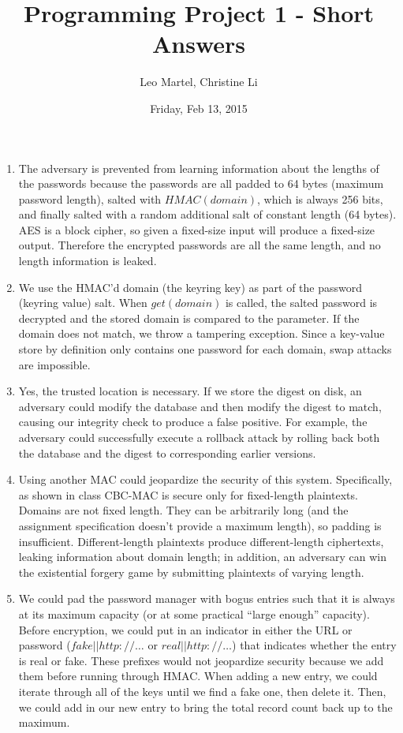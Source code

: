 \documentclass{article}[12pt]
\title{Programming Project 1 - Short Answers}
\author{Leo Martel, Christine Li}
\date{Friday, Feb 13, 2015}
\begin{document}
\maketitle

\begin{enumerate}[1.]
\item The adversary is prevented from learning information about the
  lengths of the passwords because the passwords are all padded to 64
  bytes (maximum password length), salted with $HMAC(domain)$, which is
  always 256 bits, and finally salted with a random additional salt of
  constant length (64 bytes). AES is a block cipher, so given a
  fixed-size input will produce a fixed-size output. Therefore the
  encrypted passwords are all the same length, and no length
  information is leaked.

\item We use the HMAC'd domain (the keyring key) as part of the
  password (keyring value) salt. When $get(domain)$ is called, the
  salted password is decrypted and the stored domain is compared to
  the parameter. If the domain does not match, we throw a tampering
  exception. Since a key-value store by definition only contains one
  password for each domain, swap attacks are impossible.

\item Yes, the trusted location is necessary. If we store the digest on disk, an adversary could modify the database and then modify the digest to match, causing our integrity check to produce a false positive. For example, the adversary could successfully execute a rollback attack by rolling back both the database and the digest to corresponding earlier versions.

\item Using another MAC could jeopardize the security of this system. Specifically, as shown in class CBC-MAC is secure only for fixed-length plaintexts. Domains are not fixed length. They can be arbitrarily long (and the assignment specification doesn't provide a maximum length), so padding is insufficient. Different-length plaintexts produce different-length ciphertexts, leaking information about domain length; in addition, an adversary can win the existential forgery game by submitting plaintexts of varying length.

\item We could pad the password manager with bogus entries such that it is always at its maximum capacity (or at some practical “large enough” capacity). Before encryption, we could put in an indicator in either the URL or password ($fake||http://…$ or $real||http://…$) that indicates whether the entry is real or fake. These prefixes would not jeopardize security because we add them before running through HMAC. When adding a new entry, we could iterate through all of the keys until we find a fake one, then delete it. Then, we could add in our new entry to bring the total record count back up to the maximum.


\end{enumerate}
\end{document}
